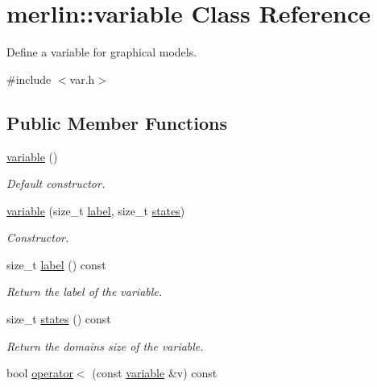 \hypertarget{classmerlin_1_1variable}{}\section{merlin\+:\+:variable Class Reference}
\label{classmerlin_1_1variable}


Define a variable for graphical models.  




{\ttfamily \#include $<$var.\+h$>$}

\subsection*{Public Member Functions}
\begin{DoxyCompactItemize}
\item 
\hyperlink{classmerlin_1_1variable_a47355f923edc3674b10564e8306a698b}{variable} ()
\begin{DoxyCompactList}\small\item\em Default constructor. \end{DoxyCompactList}\item 
\hyperlink{classmerlin_1_1variable_ab4bb4ea841ff49be221411759800b95a}{variable} (size\+\_\+t \hyperlink{classmerlin_1_1variable_a696effcebd9f62e16c782f55a85c1a4e}{label}, size\+\_\+t \hyperlink{classmerlin_1_1variable_a74aa029419d99d7acb3e6e9a307f371c}{states})
\begin{DoxyCompactList}\small\item\em Constructor. \end{DoxyCompactList}\item 
\hypertarget{classmerlin_1_1variable_a696effcebd9f62e16c782f55a85c1a4e}{}size\+\_\+t \hyperlink{classmerlin_1_1variable_a696effcebd9f62e16c782f55a85c1a4e}{label} () const \label{classmerlin_1_1variable_a696effcebd9f62e16c782f55a85c1a4e}

\begin{DoxyCompactList}\small\item\em Return the label of the variable. \end{DoxyCompactList}\item 
\hypertarget{classmerlin_1_1variable_a74aa029419d99d7acb3e6e9a307f371c}{}size\+\_\+t \hyperlink{classmerlin_1_1variable_a74aa029419d99d7acb3e6e9a307f371c}{states} () const \label{classmerlin_1_1variable_a74aa029419d99d7acb3e6e9a307f371c}

\begin{DoxyCompactList}\small\item\em Return the domains size of the variable. \end{DoxyCompactList}\item 
\hypertarget{classmerlin_1_1variable_ab7b8f9b5325a79284bdbde902bdcad35}{}bool \hyperlink{classmerlin_1_1variable_ab7b8f9b5325a79284bdbde902bdcad35}{operator$<$} (const \hyperlink{classmerlin_1_1variable}{variable} \&v) const \label{classmerlin_1_1variable_ab7b8f9b5325a79284bdbde902bdcad35}


\end{DoxyCompactItemize}
